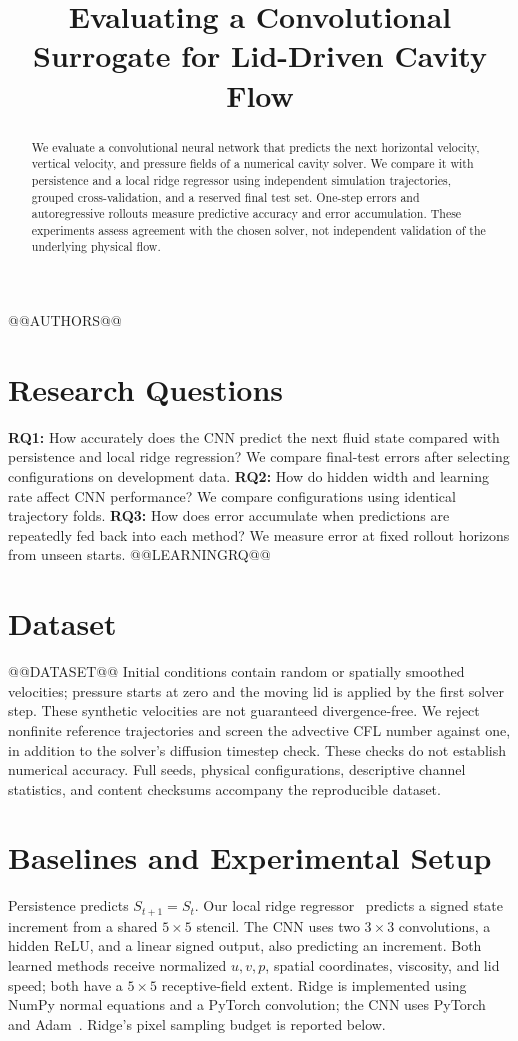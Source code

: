 \documentclass[sigconf]{acmart}
\begin{document}
\title{Evaluating a Convolutional Surrogate for Lid-Driven Cavity Flow}
@@AUTHORS@@
\begin{abstract}
We evaluate a convolutional neural network that predicts the next horizontal
velocity, vertical velocity, and pressure fields of a numerical cavity solver.
We compare it with persistence and a local ridge regressor using independent
simulation trajectories, grouped cross-validation, and a reserved final test set.
One-step errors and autoregressive rollouts measure predictive accuracy and
error accumulation. These experiments assess agreement with the chosen solver,
not independent validation of the underlying physical flow.
\end{abstract}
\maketitle
\section{Research Questions}
\textbf{RQ1:} How accurately does the CNN predict the next fluid state compared
with persistence and local ridge regression? We compare final-test errors after
selecting configurations on development data.
\textbf{RQ2:} How do hidden width and learning rate affect CNN performance?
We compare configurations using identical trajectory folds.
\textbf{RQ3:} How does error accumulate when predictions are repeatedly fed back
into each method? We measure error at fixed rollout horizons from unseen starts.
@@LEARNINGRQ@@

\section{Dataset}
@@DATASET@@
Initial conditions contain random or spatially smoothed velocities; pressure
starts at zero and the moving lid is applied by the first solver step. These
synthetic velocities are not guaranteed divergence-free. We reject nonfinite
reference trajectories and screen the advective CFL number against one, in
addition to the solver's diffusion timestep check. These checks do not establish
numerical accuracy. Full seeds, physical configurations, descriptive channel
statistics, and content checksums accompany the reproducible dataset.

\section{Baselines and Experimental Setup}
Persistence predicts $S_{t+1}=S_t$. Our local ridge regressor~\cite{ridge} predicts a signed
state increment from a shared $5\times5$ stencil. The CNN uses two $3\times3$
convolutions, a hidden ReLU, and a linear signed output, also predicting an
increment. Both learned methods receive normalized $u,v,p$, spatial coordinates,
viscosity, and lid speed; both have a $5\times5$ receptive-field extent. Ridge is
implemented using NumPy normal equations and a PyTorch convolution; the CNN uses
PyTorch~\cite{pytorch} and Adam~\cite{adam}. Ridge's pixel sampling budget is reported below.
\end{document}
